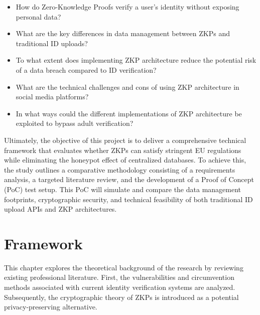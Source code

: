 \documentclass [english]{hogent-article}
\begin{document}
    \begin{itemize} 
        
        \item How do Zero-Knowledge Proofs verify a user’s identity without exposing personal data? 
        
        \item What are the key differences in data management between ZKPs and traditional ID uploads? 
        
        \item To what extent does implementing ZKP architecture reduce the potential risk of a data breach compared to ID verification? 
        
        \item What are the technical challenges and cons of using ZKP architecture in social media platforms? 
        
        \item In what ways could the different implementations of ZKP architecture be exploited to bypass adult verification? 
        
    \end{itemize}
    
    
    
    Ultimately, the objective of this project is to deliver a comprehensive technical framework that evaluates whether ZKPs can satisfy stringent EU regulations while eliminating the honeypot effect of centralized databases. To achieve this, the study outlines a comparative methodology consisting of a requirements analysis, a targeted literature review, and the development of a Proof of Concept (PoC) test setup. This PoC will simulate and compare the data management footprints, cryptographic security, and technical feasibility of both traditional ID upload APIs and ZKP architectures.
    
    
    
    \section{Framework}%
    
    \label{sec:framework}
    
    
    
    This chapter explores the theoretical background of the research by reviewing existing professional literature. First, the vulnerabilities and circumvention methods associated with current identity verification systems are analyzed. Subsequently, the cryptographic theory of ZKPs is introduced as a potential privacy-preserving alternative.
    
\end{document}
